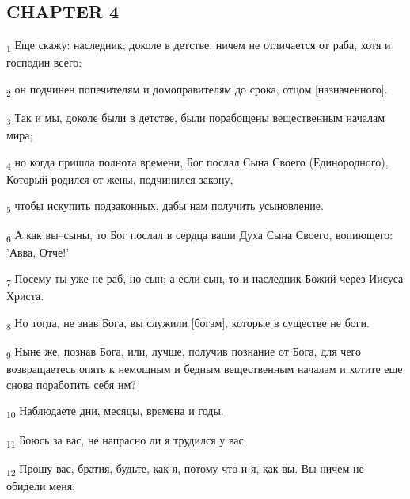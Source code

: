 \subsection{CHAPTER 4}
\begin{tcolorbox}
\textsubscript{1} Еще скажу: наследник, доколе в детстве, ничем не отличается от раба, хотя и господин всего:
\end{tcolorbox}
\begin{tcolorbox}
\textsubscript{2} он подчинен попечителям и домоправителям до срока, отцом [назначенного].
\end{tcolorbox}
\begin{tcolorbox}
\textsubscript{3} Так и мы, доколе были в детстве, были порабощены вещественным началам мира;
\end{tcolorbox}
\begin{tcolorbox}
\textsubscript{4} но когда пришла полнота времени, Бог послал Сына Своего (Единородного), Который родился от жены, подчинился закону,
\end{tcolorbox}
\begin{tcolorbox}
\textsubscript{5} чтобы искупить подзаконных, дабы нам получить усыновление.
\end{tcolorbox}
\begin{tcolorbox}
\textsubscript{6} А как вы--сыны, то Бог послал в сердца ваши Духа Сына Своего, вопиющего: 'Авва, Отче!'
\end{tcolorbox}
\begin{tcolorbox}
\textsubscript{7} Посему ты уже не раб, но сын; а если сын, то и наследник Божий через Иисуса Христа.
\end{tcolorbox}
\begin{tcolorbox}
\textsubscript{8} Но тогда, не знав Бога, вы служили [богам], которые в существе не боги.
\end{tcolorbox}
\begin{tcolorbox}
\textsubscript{9} Ныне же, познав Бога, или, лучше, получив познание от Бога, для чего возвращаетесь опять к немощным и бедным вещественным началам и хотите еще снова поработить себя им?
\end{tcolorbox}
\begin{tcolorbox}
\textsubscript{10} Наблюдаете дни, месяцы, времена и годы.
\end{tcolorbox}
\begin{tcolorbox}
\textsubscript{11} Боюсь за вас, не напрасно ли я трудился у вас.
\end{tcolorbox}
\begin{tcolorbox}
\textsubscript{12} Прошу вас, братия, будьте, как я, потому что и я, как вы. Вы ничем не обидели меня:
\end{tcolorbox}
